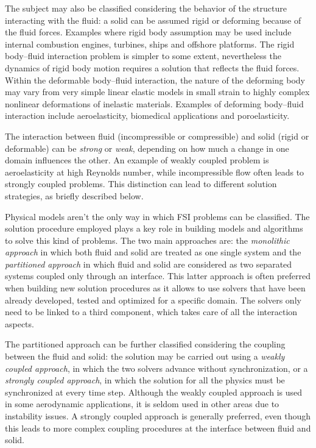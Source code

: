 The subject may also be classified considering the behavior of the structure interacting with the fluid: a solid can be assumed rigid or deforming because of the fluid forces. Examples where rigid body assumption may be used include internal combustion engines, turbines, ships and offshore platforms. The rigid body–fluid interaction problem is simpler to some extent, nevertheless the dynamics of rigid body motion requires a solution that reflects the fluid forces.
Within the deformable body–fluid interaction, the nature of the deforming body may vary from very simple linear elastic models in small strain to highly complex nonlinear deformations of inelastic materials.
Examples of deforming body–fluid interaction include aeroelasticity, biomedical applications and poroelasticity.

The interaction between fluid (incompressible or compressible) and solid (rigid or deformable) can be \textit{strong} or \textit{weak}, depending on how much a change in one domain influences the other. An example of weakly coupled problem is aeroelasticity at high Reynolds number, while incompressible flow often leads to strongly coupled problems. This distinction can lead to different solution strategies, as briefly described below. 

Physical models aren't the only way in which FSI problems can be classified. The solution procedure employed plays a key role in building models and algorithms to solve this kind of problems. The two main approaches are: the \textit{monolithic approach} in which both fluid and solid are treated as one single system and the \textit{partitioned approach} in which fluid and solid are considered as two separated systems coupled only through an interface. This latter approach is often preferred when building new solution procedures as it allows to use solvers that have been already developed, tested and optimized for a specific domain. The solvers only need to be linked to a third component, which takes care of all the interaction aspects.

The partitioned approach can be further classified considering the coupling between the fluid and solid: the solution may be carried out using a \textit{weakly coupled approach}, in which the two solvers advance without synchronization, or a \textit{strongly coupled approach}, in which the solution for all the physics must be synchronized at every time step. Although the weakly coupled approach is used in some aerodynamic applications, it is seldom used in other areas due to instability issues. A strongly coupled approach is generally preferred, even though this leads to more complex coupling procedures at the interface between fluid and solid.

